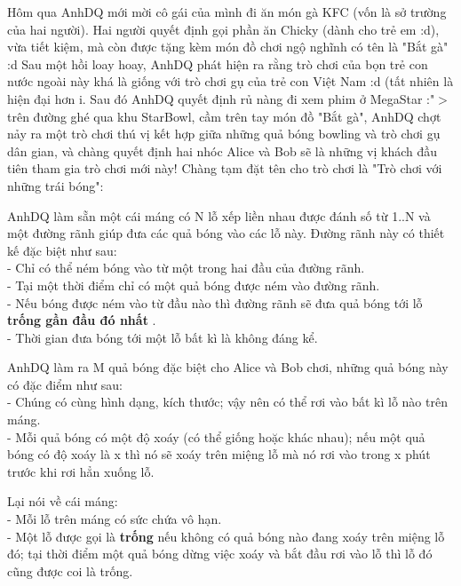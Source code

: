 







   Hôm qua AnhDQ mới mời cô gái của mình đi ăn món gà KFC (vốn là sở trường của hai người). Hai người quyết định gọi phần ăn Chicky (dành cho trẻ em :d), vừa tiết kiệm, mà còn được tặng kèm món đồ chơi ngộ nghĩnh có tên là "Bắt gà" :d Sau một hồi loay hoay, AnhDQ phát hiện ra rằng trò chơi của bọn trẻ con nước ngoài này khá là giống với trò chơi gụ của trẻ con Việt Nam :d (tất nhiên là hiện đại hơn ^^). Sau đó AnhDQ quyết định rủ nàng đi xem phim ở MegaStar :"$>$ trên đường ghé qua khu StarBowl, cầm trên tay món đồ "Bắt gà", AnhDQ chợt nảy ra một trò chơi thú vị kết hợp giữa những quả bóng bowling và trò chơi gụ dân gian, và chàng quyết định hai nhóc Alice và Bob sẽ là những vị khách đầu tiên tham gia trò chơi mới này! Chàng tạm đặt tên cho trò chơi là "Trò chơi với những trái bóng":  

   AnhDQ làm sẵn một cái máng có N lỗ xếp liền nhau được đánh số từ 1..N và một đường rãnh giúp đưa các quả bóng vào các lỗ này. Đường rãnh này có thiết kế đặc biệt như sau:   
\\   - Chỉ có thể ném bóng vào từ một trong hai đầu của đường rãnh.   
\\   - Tại một thời điểm chỉ có một quả bóng được ném vào đường rãnh.   
\\   - Nếu bóng được ném vào từ đầu nào thì đường rãnh sẽ đưa quả bóng tới lỗ   \textbf{    trống gần đầu đó nhất   }   .   
\\   - Thời gian đưa bóng tới một lỗ bất kì là không đáng kể.  

   AnhDQ làm ra M quả bóng đặc biệt cho Alice và Bob chơi, những quả bóng này có đặc điểm như sau:   
\\   - Chúng có cùng hình dạng, kích thước; vậy nên có thể rơi vào bất kì lỗ nào trên máng.   
\\   - Mỗi quả bóng có một độ xoáy (có thể giống hoặc khác nhau); nếu một quả bóng có độ xoáy là x thì nó sẽ xoáy trên miệng lỗ mà nó rơi vào trong x phút trước khi rơi hẳn xuống lỗ.  

   Lại nói về cái máng:   
\\   - Mỗi lỗ trên máng có sức chứa vô hạn.   
\\   - Một lỗ được gọi là   \textbf{    trống   }   nếu không có quả bóng nào đang xoáy trên miệng lỗ đó; tại thời điểm một quả bóng dừng việc xoáy và bắt đầu rơi vào lỗ thì lỗ đó cũng được coi là trống.  

